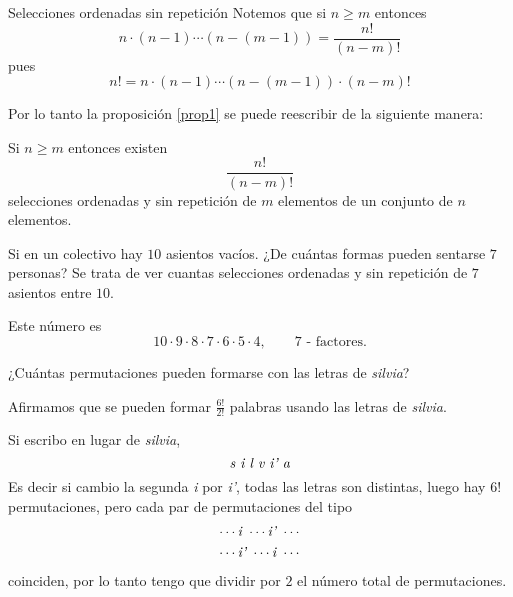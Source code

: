 \begin{section}{Selecciones ordenadas sin repetición}
Notemos que si $n \ge m$ entonces
$$
n \cdot (n - 1) \cdots (n - (m - 1)) = \frac{n!}{(n - m)!}
$$
pues
$$
n! = n \cdot (n - 1 ) \cdots (n -(m - 1 ) ) \cdot (n -m)!
$$

Por lo tanto  la proposición \ref{prop1} se puede reescribir de 
la siguiente manera:


\begin{proposicion}Si $n \ge m$ entonces existen
\begin{equation}\label{ordsinrep2}
\frac{n!}{(n - m)!}
\end{equation}
selecciones ordenadas y sin repetición de $m$ elementos de un conjunto de $n$ elementos.
\end{proposicion}


\begin{ejemplo}
Si en un colectivo hay $10$ asientos vacíos. ¿De cuántas formas
pueden sentarse $7$ personas? Se trata de ver cuantas selecciones ordenadas y sin repetición de $7$ asientos entre $10$. 

Este número es
$$
10 \cdot 9 \cdot 8 \cdot 7 \cdot 6 \cdot 5 \cdot 4, \qquad \text{$7$ - factores.}
$$
\end{ejemplo}


\begin{ejemplo}
¿Cuántas permutaciones pueden formarse con las letras de
{\em silvia}?

Afirmamos que se pueden formar  $\displaystyle{\frac{6!}{2!}}$ palabras usando las letras de {\em silvia}.

Si escribo en lugar de {\em silvia},
$$
\text{\em s i l v i' a}
$$
Es decir si cambio la segunda {\em i } por {\em i'}, todas las letras son distintas, luego hay $6!$ permutaciones, pero
cada par de permutaciones del tipo
\begin{align*}
\cdots \text{\em i } \cdots  \text{\em i' }  \cdots \\
\cdots \text{\em i' } \cdots  \text{\em i } \cdots
\end{align*}
coinciden, por lo tanto tengo que dividir por $2$ el número total de permutaciones.


\end{ejemplo}
\end{section}

